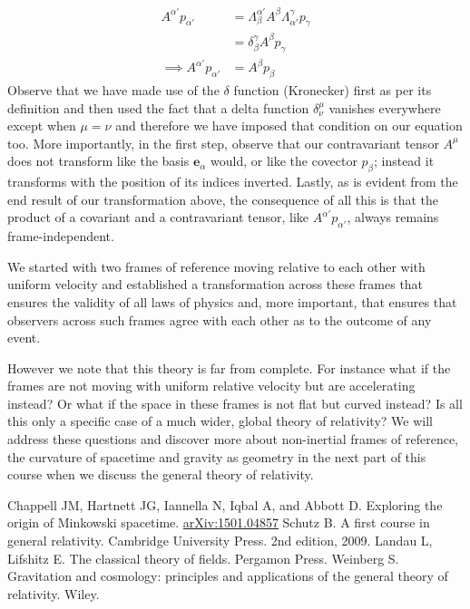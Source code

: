 \documentclass[english,seminar]{lecture}
\begin{document}
\begin{align*}
	A^{\alpha '}p_{\alpha '} &= \Lambda^{\alpha '}_\beta A^\beta \Lambda^\gamma_{\alpha '} p_\gamma \\
				&= \delta^\gamma_\beta A^\beta p_\gamma \\
\implies A^{\alpha '}p_{\alpha '} &= A^\beta p_\beta
\end{align*}%
Observe that we have made use of the $\delta$ function (Kronecker) first as per its definition and then used the fact that a delta function $\delta^\mu_\nu$ vanishes everywhere except when $\mu = \nu$ and therefore we have imposed that condition on our equation too. More importantly, in the first step, observe that our contravariant tensor $A^\mu$ does not transform like the basis $\mathbf{e}_\alpha$ would, or like the covector $p_\beta$; instead it transforms with the position of its indices inverted. Lastly, as is evident from the end result of our transformation above, the consequence of all this is that the product of a covariant and a contravariant tensor, like $A^{\alpha '}p_{\alpha '}$, always remains frame-independent.

\noindent{} We started with two frames of reference moving relative to each other with uniform velocity and established a transformation across these frames that ensures the validity of all laws of physics and, more important, that ensures that observers across such frames agree with each other as to the outcome of any event.

However we note that this theory is far from complete. For instance what if the frames are not moving with uniform relative velocity but are accelerating instead? Or what if the space in these frames is not flat but curved instead? Is all this only a specific case of a much wider, global theory of relativity? We will address these questions and discover more about non-inertial frames of reference, the curvature of spacetime and gravity as geometry in the next part of this course when we discuss the general theory of relativity.

\begin{thebibliography}{99}
	Chappell JM, Hartnett JG, Iannella N, Iqbal A, and Abbott D. Exploring the origin of Minkowski spacetime. \href{https://arxiv.org/abs/1501.04857}{\ttfamily arXiv:1501.04857}
	Schutz B. A first course in general relativity. Cambridge University Press. 2nd edition, 2009.
	Landau L, Lifshitz E. The classical theory of fields. Pergamon Press.
	Weinberg S. Gravitation and cosmology: principles and applications of the general theory of relativity. Wiley.
\end{thebibliography}
\end{document}
